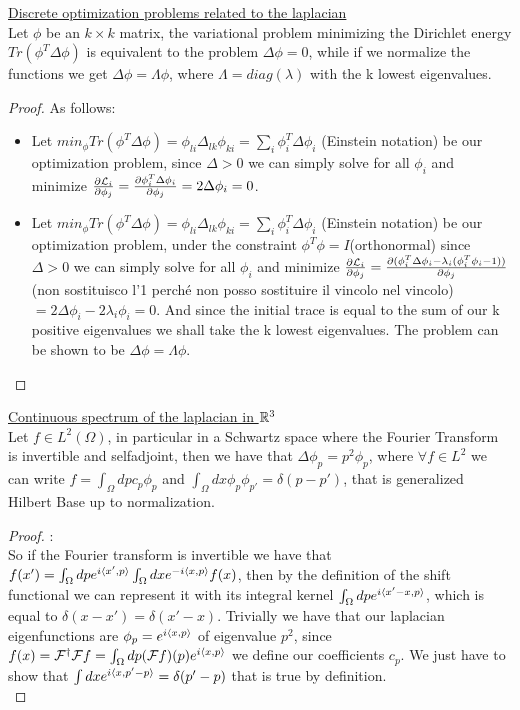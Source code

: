 \documentclass[../main.tex]{subfiles}
\begin{document}
\begin{prop}
    \underline{Discrete optimization problems related to the laplacian}\\
    Let $\phi$ be an $k \times k$ matrix, the variational problem minimizing the Dirichlet energy $Tr(\phi^T \Delta \phi)$ is equivalent to
    the problem $\Delta \phi = 0$, while if we normalize the functions we get $\Delta \phi = \Lambda \phi$, where $\Lambda = diag(\lambda)$ with 
    the k lowest eigenvalues.
\end{prop}
\begin{proof} As follows:\\
    \begin{itemize}
        \item
	Let $min_{\phi}Tr(\phi^T \Delta \phi) = \phi_{li}\Delta_{lk}\phi_{ki} = \sum_i \phi_i^T \Delta \phi_i $ (Einstein notation) be our optimization problem,
	since $\Delta > 0$ we can simply solve for all $\phi_i$ and minimize $\frac{\partial \mathcal{L}_i}{\partial \phi_j} = \frac{\partial \phi_i^T \Delta \phi_i}{\partial \phi_j}
	 = 2\Delta\phi_i=0$.
	 \item
	Let $min_{\phi}Tr(\phi^T \Delta \phi) = \phi_{li}\Delta_{lk}\phi_{ki} = \sum_i \phi_i^T \Delta \phi_i $ (Einstein notation) be our optimization problem,
        under the constraint $\phi^T \phi = I$(orthonormal) since $\Delta > 0$ we can simply solve for all $\phi_i$ and minimize 
	$\frac{\partial \mathcal{L}_i}{\partial \phi_j} = \frac{\partial (\phi_i^T \Delta \phi_i -\lambda_i(\phi_i^T\phi_i -1))}{\partial \phi_j}$(non sostituisco l'1 perché non posso sostituire il vincolo 
	nel vincolo)$ = 2\Delta\phi_i-2\lambda_i\phi_i=0$. And since the initial trace is equal to the sum of our k positive eigenvalues we shall take the
	k lowest eigenvalues. The problem can be shown to be $\Delta \phi = \Lambda \phi$.
   \end{itemize}
\end{proof}

\begin{prop}
    \underline{Continuous spectrum of the laplacian in $\mathbb{R}^3$}\\
    Let $f \in L^2(\Omega)$, in particular in a Schwartz space where the Fourier Transform is invertible and selfadjoint,
    then we have that $\Delta \phi_p = p^2 \phi_p$, where $\forall f \in L^2$ we can write $f = \int_\Omega dp c_p \phi_p$
    and $\int_\Omega dx \phi_p \phi_{p'} = \delta(p-p')$, that is generalized Hilbert Base up to normalization.
\end{prop}
\begin{proof}:\\
    So if the Fourier transform is invertible we have that $f(x') = \int_\Omega dp e^{i\langle x', p \rangle}\int_\Omega dx e^{-i\langle x, p \rangle}f(x)$, 
    then by the definition of the shift functional we can represent it with its integral kernel $\int_\Omega dp e^{i\langle x'-x, p \rangle}$, which
    is equal to $\delta(x-x') = \delta(x'-x)$. Trivially we have that our laplacian eigenfunctions are $\phi_p = e^{i\langle x, p \rangle}$ of eigenvalue $p^2$, since 
    $f(x) = \mathcal{F}^\dag \mathcal{F}f = \int_\Omega dp (\mathcal{F}f)(p)e^{i\langle x, p \rangle}$ we define our coefficients $c_p$. We just have to show that
    $\int dx e^{i\langle x, p'-p \rangle} = \delta(p'-p)$ that is true by definition.\\
\end{proof}
\end{document}
